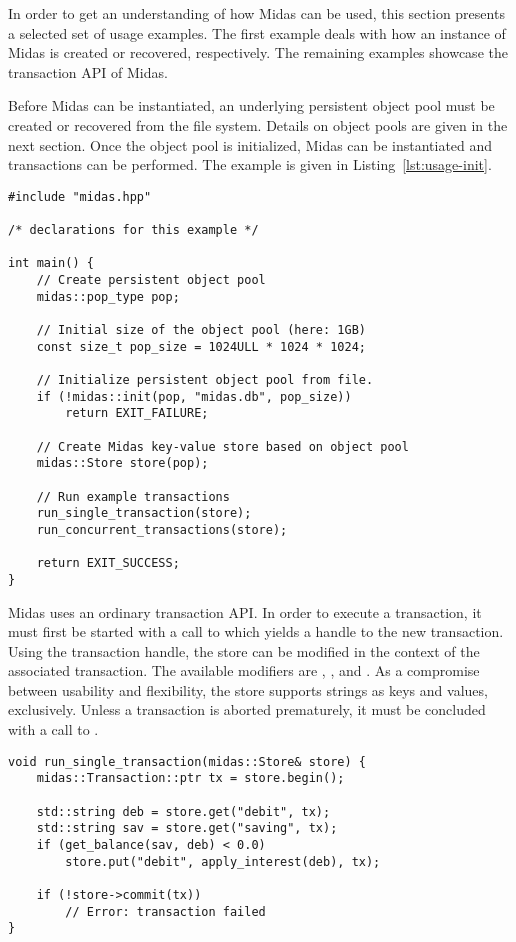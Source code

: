 In order to get an understanding of how Midas can be used, this section presents
a selected set of usage examples. The first example deals with how an instance
of Midas is created or recovered, respectively. The remaining examples showcase
the transaction API of Midas.

Before Midas can be instantiated, an underlying persistent object pool must be
created or recovered from the file system. Details on object pools are given in
the next section. Once the object pool is initialized, Midas can be instantiated
and transactions can be performed. The example is given in
Listing~\ref{lst:usage-init}.

\begin{lstlisting}[caption={Midas Bootstrapping.},captionpos=b, label=lst:usage-init]
#include "midas.hpp"

/* declarations for this example */

int main() {
    // Create persistent object pool
    midas::pop_type pop;

    // Initial size of the object pool (here: 1GB)
    const size_t pop_size = 1024ULL * 1024 * 1024;

    // Initialize persistent object pool from file.
    if (!midas::init(pop, "midas.db", pop_size))
        return EXIT_FAILURE;

    // Create Midas key-value store based on object pool
    midas::Store store(pop);

    // Run example transactions
    run_single_transaction(store);
    run_concurrent_transactions(store);

    return EXIT_SUCCESS;
}
\end{lstlisting}

Midas uses an ordinary transaction API. In order to execute a transaction, it
must first be started with a call to  which yields a handle
to the new transaction. Using the transaction handle, the store can be modified
in the context of the associated transaction. The available modifiers are
, , and . As a
compromise between usability and flexibility, the store supports strings as keys
and values, exclusively. Unless a transaction is aborted prematurely, it must
be concluded with a call to .

\begin{lstlisting}[caption={A single transaction on account data.},captionpos=b, label=lst:usage-single-tx]
void run_single_transaction(midas::Store& store) {
    midas::Transaction::ptr tx = store.begin();

    std::string deb = store.get("debit", tx);
    std::string sav = store.get("saving", tx);
    if (get_balance(sav, deb) < 0.0)
        store.put("debit", apply_interest(deb), tx);

    if (!store->commit(tx))
        // Error: transaction failed
}
\end{lstlisting}

